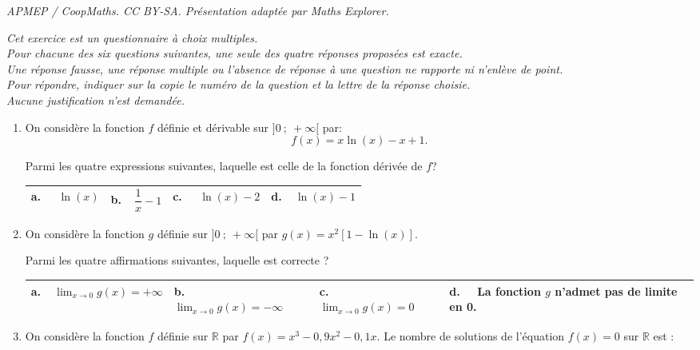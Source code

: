 \documentclass[10pt]{article}
\providecommand{\R}{\mathbb{R}}
\begin{document}
\noindent\textit{APMEP / CoopMaths. CC BY-SA. Présentation adaptée par Maths Explorer.}\par\medskip
\medskip

\emph{Cet exercice est un questionnaire à choix multiples. \\
Pour chacune des six questions suivantes, une seule des quatre réponses proposées est exacte.\\
Une réponse fausse, une réponse multiple ou l'absence de réponse à une question ne rapporte ni n'enlève de point.\\
Pour répondre, indiquer sur la copie le numéro de la question et la lettre de la réponse choisie.\\
Aucune justification n'est demandée.}

\medskip

\begin{enumerate}
\item On considère la fonction $f$ définie et dérivable sur $]0~;~+\infty[$ par:
\[f(x) = x \ln(x) - x + 1.\]

Parmi les quatre expressions suivantes, laquelle est celle de la fonction dérivée de $f$?

\begin{center}
\begin{tabularx}{\linewidth}{|*{4}{X|}}\hline
\textbf{a.~~} $\ln (x)$&\textbf{b.~~}$\dfrac{1}{x} - 1$&\textbf{c.~~} $\ln (x) - 2$&\textbf{d.~~}$\ln (x) - 1$\rule[-3mm]{0mm}{9mm}\\ \hline
\end{tabularx}
\end{center}

\item On considère la fonction $g$ définie sur $]0~;~+\infty[$ par $g(x) = x^2[1 - \ln (x)]$.

 Parmi les quatre affirmations suivantes, laquelle est correcte ?
 
\begin{center}
\begin{tabularx}{\linewidth}{|*{4}{X|}}\hline
\textbf{a.~~}$\displaystyle\lim_{x \to 0} g(x) = +\infty$&\textbf{b.~~} 
$\displaystyle\lim_{x \to 0} g(x) = - \infty$&\textbf{c.~~} $\displaystyle\lim_{x \to 0} g(x) = 0$&\textbf{d.~~} La fonction $g$ n'admet pas de limite en 0.\\ \hline
\end{tabularx}
\end{center}

\item On considère la fonction $f$ définie sur $\R$ par $f(x) = x^3 - 0,9x^2 -0,1x$. Le nombre de solutions de l'équation $f(x) = 0$ sur $\R$ est :


\end{enumerate}
\end{document}

